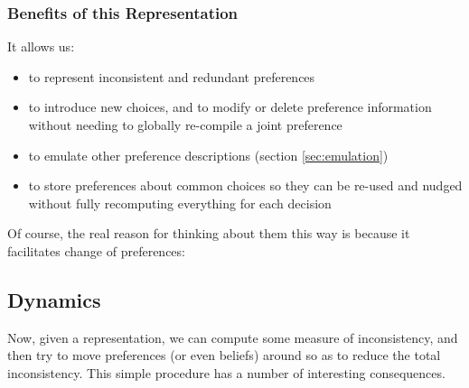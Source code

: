 \documentclass{article}
\begin{document}
	\subsubsection{Benefits of this Representation}
	It allows us:
	\begin{itemize}[nosep]
		\item to represent inconsistent and redundant preferences
		\item to introduce new choices, and to modify or delete preference information without needing to globally re-compile a joint preference
		\item to emulate other preference descriptions (section \ref{sec:emulation})
		\item to store preferences about common choices so they can be re-used and nudged without fully recomputing everything for each decision
	\end{itemize}
	Of course, the real reason for thinking about them this way is because it facilitates change of preferences:
	
	
	

	
	\subsection{Dynamics}
	
	Now, given a representation, we can compute some measure of inconsistency, and then try to move preferences (or even beliefs) around so as to reduce the total inconsistency. This simple procedure has a number of interesting consequences.
	
\end{document}
